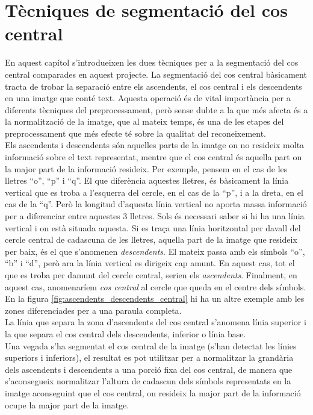\chapter{Tècniques de segmentació del cos central}
\label{cap:seg}
En aquest capítol s'introdueixen les dues tècniques per a la segmentació del cos central comparades en aquest projecte. La segmentació del cos central bàsicament tracta de trobar la separació entre els ascendents, el cos central i els descendents en una imatge que conté text. Aquesta operació és de vital importància per a diferents tècniques del preprocessament, però sense dubte a la que més afecta és a la normalització de la imatge, que al mateix temps, és una de les etapes del preprocessament que més efecte té sobre la qualitat del reconeixement. \\

Els ascendents i descendents són aquelles parts de la imatge on no resideix molta informació sobre el text representat, mentre que el cos central és aquella part on la major part de la informació resideix. Per exemple, pensem en el cas de les lletres ``o'', ``p'' i ``q''. El que diferència aquestes lletres, és bàsicament la línia vertical que es troba a l'esquerra del cercle, en el cas de la ``p'', i a la dreta, en el cas de la ``q''. Però la longitud d'aquesta línia vertical no aporta massa informació per a diferenciar entre aquestes 3 lletres. Sols és necessari saber si hi ha una línia vertical i on està situada aquesta. Si es traça una línia horitzontal per davall del cercle central de cadascuna de les lletres, aquella part de la imatge que resideix per baix, és el que s'anomenen \emph{descendents}. El mateix passa amb els símbols ``o'', ``b'' i ``d'', però ara la línia vertical es dirigeix cap amunt. En aquest cas, tot el que es troba per damunt del cercle central, serien els \emph{ascendents}. Finalment, en aquest cas, anomenaríem \emph{cos central} al cercle que queda en el centre dels símbols. En la figura \ref{fig:ascendents_descendents_central} hi ha un altre exemple amb les zones diferenciades per a una paraula completa. \\

La línia que separa la zona d'ascendents del cos central s'anomena línia superior i la que separa el cos central dels descendents, inferior o línia base. \\

Una vegada s'ha segmentat el cos central de la imatge (s'han detectat les línies superiors i inferiors), el resultat es pot utilitzar per a normalitzar la grandària dels ascendents i descendents a una porció fixa del cos central, de manera que s'aconsegueix normalitzar l'altura de cadascun dels símbols representats en la imatge aconseguint que el cos central, on resideix la major part de la informació ocupe la major part de la imatge.

